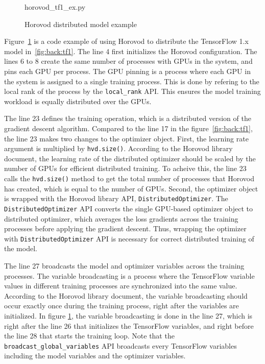 \begin{figure}[ht!]
 
{horovod_tf1_ex.py}
  \caption{Horovod distributed model example}
\label{fig:back:hvd1} 
\end{figure}

Figure~\ref{fig:back:hvd1} is a code example of using Horovod to distribute
the TensorFlow 1.x model in~\ref{fig:back:tf1}.
The line 4 first initializes the Horovod configuration.
The lines 6 to 8 create the same number of processes with GPUs in the system,
and pins each GPU per process. 
The GPU pinning is a process where each GPU in the system is assigned to a 
single training process.
This is done by refering to the local rank of the process 
by the {\tt local\_rank} API.
This ensures the model training workload is equally distributed over
the GPUs.

The line 23 defines the training operation, 
which is a distributed version of the gradient descent algorithm.
Compared to the line 17 in the figure~\ref{fig:back:tf1},
the line 23 makes two changes to the optimizer object.
First, the learning rate argument is multiplied by {\tt hvd.size()}.
According to the Horovod library document,
the learning rate of the distributed optimizer 
should be scaled by the number of GPUs for efficient distributed training.
To acheive this, the line 23 calls the {\tt hvd.size()} method to
get the total number of processes that Horovod has created,
which is equal to the number of GPUs.
Second, the optimizer object is wrapped with the Horovod library API,
{\tt DistributedOptimizer}.
The {\tt DistributedOptimizer} API converts the single GPU-based optimizer 
object to distributed optimizer, which averages the loss gradients across the
training processes before applying the gradient descent.
Thus, wrapping the optimizer with {\tt DistributedOptimizer} API is necessary
for correct distributed training of the model.

The line 27 broadcasts the model and optimizer variables across the training
processes.
The variable broadcasting is a process where the TensorFlow 
variable values in different training processes are synchronized into
the same value.
According to the Horovod library document, the variable broadcasting
should occur exactly once during the training process,
right after the variables are initialized.
In figure \ref{fig:back:hvd1}, the variable broadcasting is done in the line 27,
which is right after the line 26 that initializes the TensorFlow variables,
and right before the line 28 that starts the training loop.
Note that the {\tt broadcast\_global\_variables} API broadcasts every
TensorFlow variables including the model variables and the optimizer
variables.


